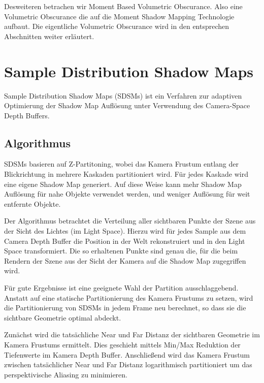 \documentclass[runningheaders,a4paper]{llncs}
\begin{document}
Desweiteren betrachen wir Moment Based Volumetric Obscurance. Also eine Volumetric Obscurance die auf die Moment Shadow Mapping Technologie aufbaut. Die eigentliche Volumetric Obscurance wird in den entsprechen Abschnitten weiter erläutert.

\section{Sample Distribution Shadow Maps}

Sample Distribution Shadow Maps (SDSMs) ist ein Verfahren zur adaptiven Optimierung der Shadow Map Auflösung unter Verwendung des Camera-Space Depth Buffers.

\subsection{Algorithmus}

SDSMs basieren auf Z-Partitoning, wobei das Kamera Frustum entlang der Blickrichtung in mehrere Kaskaden partitioniert wird. Für jedes Kaskade wird eine eigene Shadow Map generiert.
Auf diese Weise kann mehr Shadow Map Auflösung für nahe Objekte verwendet werden, und weniger Auflösung für weit entfernte Objekte.


Der Algorithmus betrachtet die Verteilung aller sichtbaren Punkte der Szene aus der Sicht des Lichtes (im Light Space).
Hierzu wird für jedes Sample aus dem Camera Depth Buffer die Position in der Welt rekonstruiert und in den Light Space transformiert.
Die so erhaltenen Punkte sind genau die, für die beim Rendern der Szene aus der Sicht der Kamera auf die Shadow Map zugegriffen wird.


Für gute Ergebnisse ist eine geeignete Wahl der Partition ausschlaggebend.
Anstatt auf eine statische Partitionierung des Kamera Frustums \cite{pssm} zu setzen, wird die Partitionierung von SDSMs in jedem Frame neu berechnet, so dass sie die sichtbare Geometrie optimal abdeckt.

Zunächst wird die tatsächliche Near und Far Distanz der sichtbaren Geometrie im Kamera Frustums ermittelt.
Dies geschieht mittels Min/Max Reduktion der Tiefenwerte im Kamera Depth Buffer.
Anschließend wird das Kamera Frustum zwischen tatsächlicher Near und Far Distanz logarithmisch partitioniert um das perspektivische Aliasing zu minimieren.
\end{document}
